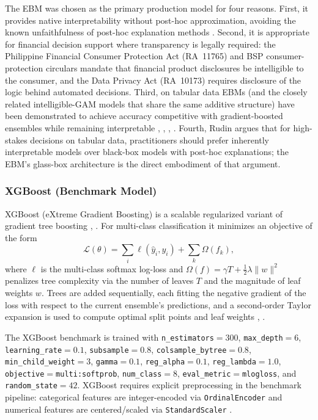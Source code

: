 \documentclass[journal]{./IEEE/IEEEtran}
\begin{document}
The EBM was chosen as the primary production model for four reasons. First, it provides native interpretability without post-hoc approximation, avoiding the known unfaithfulness of post-hoc explanation methods \cite{ref51}. Second, it is appropriate for financial decision support where transparency is legally required: the Philippine Financial Consumer Protection Act (RA~11765) \cite{ref44} and BSP consumer-protection circulars mandate that financial product disclosures be intelligible to the consumer, and the Data Privacy Act (RA~10173) \cite{ref45} requires disclosure of the logic behind automated decisions. Third, on tabular data EBMs (and the closely related intelligible-GAM models that share the same additive structure) have been demonstrated to achieve accuracy competitive with gradient-boosted ensembles while remaining interpretable \cite{ref15}, \cite{ref48}, \cite{ref49}, \cite{ref50}. Fourth, Rudin \cite{ref51} argues that for high-stakes decisions on tabular data, practitioners should prefer inherently interpretable models over black-box models with post-hoc explanations; the EBM's glass-box architecture is the direct embodiment of that argument.

\subsubsection{XGBoost (Benchmark Model)}

XGBoost (eXtreme Gradient Boosting) is a scalable regularized variant of gradient tree boosting \cite{ref16}, \cite{ref67}. For multi-class classification it minimizes an objective of the form
\begin{equation*}
    \mathcal{L}(\theta) = \sum_{i} \ell(\hat{y}_i, y_i) + \sum_{k} \Omega(f_k),
\end{equation*}
where $\ell$ is the multi-class softmax log-loss and $\Omega(f) = \gamma T + \tfrac{1}{2}\lambda \| w \|^2$ penalizes tree complexity via the number of leaves $T$ and the magnitude of leaf weights $w$. Trees are added sequentially, each fitting the negative gradient of the loss with respect to the current ensemble's predictions, and a second-order Taylor expansion is used to compute optimal split points and leaf weights \cite{ref16}, \cite{ref67}.

The XGBoost benchmark is trained with \texttt{n\_estimators}$=300$, \texttt{max\_depth}$=6$, \texttt{learning\_rate}$=0.1$, \texttt{subsample}$=0.8$, \texttt{colsample\_bytree}$=0.8$, \texttt{min\_child\_weight}$=3$, \texttt{gamma}$=0.1$, \texttt{reg\_alpha}$=0.1$, \texttt{reg\_lambda}$=1.0$, \texttt{objective}$=$\texttt{multi:softprob}, \texttt{num\_class}$=8$, \texttt{eval\_metric}$=$\texttt{mlogloss}, and \texttt{random\_state}$=42$. XGBoost requires explicit preprocessing in the benchmark pipeline: categorical features are integer-encoded via \texttt{OrdinalEncoder} and numerical features are centered/scaled via \texttt{StandardScaler} \cite{ref74}.
\end{document}

